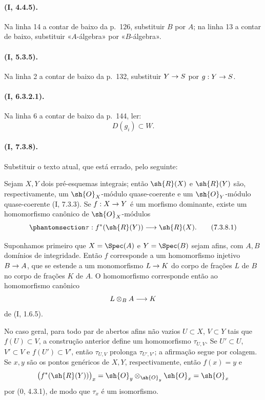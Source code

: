 \documentclass[oneside,10pt]{amsart}
\makeatletter
\newcommand{\ega@arrow}[2]{\mathchoice{#1}{#2}{#2}{#2}}
\renewcommand{\to}{\ega@arrow{\longrightarrow}{\rightarrow}}
\newcommand{\oldpage}[2][]{\marginnote{\normalfont\footnotesize\textbf{#1}~|~#2}\ignorespaces}
\let\EGAOriginalLabel\label
\renewcommand{\label}[1]{\phantomsection\EGAOriginalLabel{#1}}
\makeatother
\begin{document}
\paragraph{(I, 4.4.5).}
Na linha 14 a contar de baixo da p.~126, substituir $B$ por $A$; na
linha 13 a contar de baixo, substituir «$A$-álgebra» por
«$B$-álgebra».

\paragraph{(I, 5.3.5).}
Na linha 2 a contar de baixo da p.~132, substituir $Y\to S$ por
$g:Y\to S$.

\paragraph{(I, 6.3.2.1).}
Na linha 6 a contar de baixo da p.~144, ler:
\[
  D(g_i)\subset W.
\]

\paragraph{(I, 7.3.8).}
Substituir o texto atual, que está errado, pelo seguinte:

Sejam $X,Y$ dois pré-esquemas integrais; então $\sh{R}(X)$ e
$\sh{R}(Y)$ são, respectivamente, um $\sh{O}_X$-módulo quase-coerente
e um $\sh{O}_Y$-módulo quase-coerente (I, 7.3.3). Se $f:X\to Y$ é um
morfismo dominante, existe um homomorfismo canônico de
$\sh{O}_X$-módulos
\oldpage[II]{222}
\begin{equation}
\label{ega2:addendum:I.7.3.8.1}
  \tau:f^*(\sh{R}(Y))\to\sh{R}(X).
\tag{7.3.8.1}
\end{equation}

Suponhamos primeiro que $X=\Spec(A)$ e $Y=\Spec(B)$ sejam afins, com
$A,B$ domínios de integridade. Então $f$ corresponde a um
homomorfismo injetivo $B\to A$, que se estende a um monomorfismo
$L\to K$ do corpo de frações $L$ de $B$ no corpo de frações $K$ de
$A$. O homomorfismo  corresponde então ao
homomorfismo canônico
\[
  L\otimes_B A\to K
\]
de (I, 1.6.5).

No caso geral, para todo par de abertos afins não vazios
$U\subset X$, $V\subset Y$ tais que $f(U)\subset V$, a construção
anterior define um homomorfismo $\tau_{U,V}$. Se $U'\subset U$,
$V'\subset V$ e $f(U')\subset V'$, então $\tau_{U,V}$ prolonga
$\tau_{U',V'}$; a afirmação segue por colagem. Se $x,y$ são os pontos
genéricos de $X,Y$, respectivamente, então $f(x)=y$ e
\[
  \bigl(f^*(\sh{R}(Y))\bigr)_x
  =\sh{O}_y\otimes_{\sh{O}_y}\sh{O}_x
  =\sh{O}_x
\]
por (0, 4.3.1), de modo que $\tau_x$ é um isomorfismo.
\end{document}

